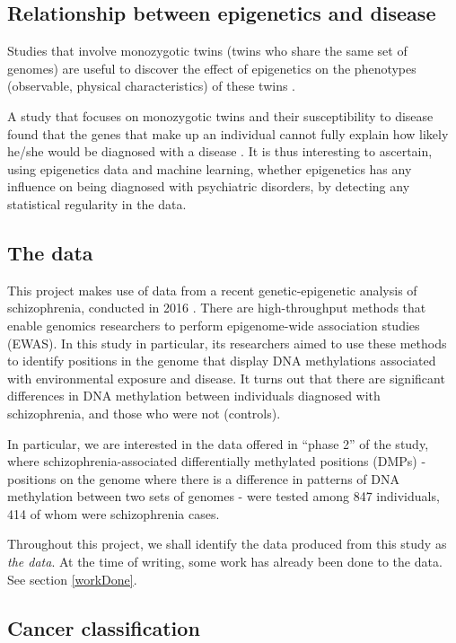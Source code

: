 \documentclass[12pt, twoside, a4paper]{article}
\begin{document}
\subsection{Relationship between epigenetics and disease} \label{bg_epigenetics}
Studies that involve monozygotic twins (twins who share the same set of genomes) are useful to discover the effect of epigenetics on the phenotypes (observable, physical characteristics) of these twins \cite{RefWorks:104}.

A study that focuses on monozygotic twins and their susceptibility to disease found that the genes that make up an individual cannot fully explain how likely he/she would be diagnosed with a disease \cite{RefWorks:105}. It is thus interesting to ascertain, using epigenetics data and machine learning, whether epigenetics has any influence on being diagnosed with psychiatric disorders, by detecting any statistical regularity in the data.

\subsection{The data} \label{bg_genetic_data}
This project makes use of data from a recent genetic-epigenetic analysis of schizophrenia, conducted in 2016 \cite{RefWorks:78}. There are high-throughput methods that enable genomics researchers to perform epigenome-wide association studies (EWAS). In this study in particular, its researchers aimed to use these methods to identify positions in the genome that display DNA methylations associated with environmental exposure and disease. It turns out that there are significant differences in DNA methylation between individuals diagnosed with schizophrenia, and those who were not (controls).

In particular, we are interested in the data offered in ``phase 2'' of the study, where schizophrenia-associated differentially methylated positions (DMPs) - positions on the genome where there is a difference in patterns of DNA methylation between two sets of genomes - were tested among 847 individuals, 414 of whom were schizophrenia cases.

Throughout this project, we shall identify the data produced from this study as \textit{the data}. At the time of writing, some work has already been done to the data. See section \ref{workDone}.

\subsection{Cancer classification} \label{bg_cancer}
\end{document}
